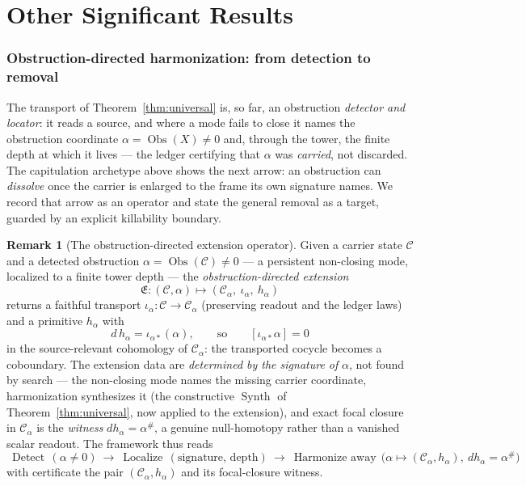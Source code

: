 \documentclass[11pt]{article}
\theoremstyle{definition}
\newtheorem{remark}[theorem]{Remark}
\begin{document}
\part{Other Significant Results}

\section{Obstruction-directed harmonization: from detection to removal}\label{sec:obs-removal}

The transport of Theorem~\ref{thm:universal} is, so far, an obstruction \emph{detector and locator}: it reads a
source, and where a mode fails to close it names the obstruction coordinate $\alpha=\operatorname{Obs}(X)\neq0$
and, through the tower, the finite depth at which it lives --- the ledger certifying that $\alpha$ was
\emph{carried}, not discarded. The capitulation archetype above shows the next arrow: an obstruction can
\emph{dissolve} once the carrier is enlarged to the frame its own signature names. We record that arrow as an
operator and state the general removal as a target, guarded by an explicit killability boundary.

\begin{remark}[The obstruction-directed extension operator]\label{def:obs-ext}
Given a carrier state $\mathcal C$ and a detected obstruction $\alpha=\operatorname{Obs}(\mathcal C)\neq0$ --- a
persistent non-closing mode, localized to a finite tower depth --- the \emph{obstruction-directed extension}
\[
  \mathfrak E:(\mathcal C,\alpha)\longmapsto(\mathcal C_\alpha,\ \iota_\alpha,\ h_\alpha)
\]
returns a faithful transport $\iota_\alpha:\mathcal C\to\mathcal C_\alpha$ (preserving readout and the ledger
laws) and a primitive $h_\alpha$ with
\[
  d\,h_\alpha=\iota_{\alpha*}(\alpha),\qquad\text{so}\qquad [\iota_{\alpha*}\alpha]=0
\]
in the source-relevant cohomology of $\mathcal C_\alpha$: the transported cocycle becomes a coboundary. The
extension data are \emph{determined by the signature of} $\alpha$, not found by search --- the non-closing mode
names the missing carrier coordinate, harmonization synthesizes it (the constructive $\operatorname{Synth}$ of
Theorem~\ref{thm:universal}, now applied to the extension), and exact focal closure in $\mathcal C_\alpha$ is the
\emph{witness} $d h_\alpha=\alpha^\#$, a genuine null-homotopy rather than a vanished scalar readout. The
framework thus reads
\[
  \boxed{\ \operatorname{Detect}\,(\alpha\neq0)\ \rightarrow\ \operatorname{Localize}\,(\text{signature, depth})\ \rightarrow\ \operatorname{Harmonize\ away}\,\big(\alpha\mapsto(\mathcal C_\alpha,h_\alpha),\ dh_\alpha=\alpha^\#\big)\ }
\]
with certificate the pair $(\mathcal C_\alpha,h_\alpha)$ and its focal-closure witness.
\end{remark}
\end{document}
